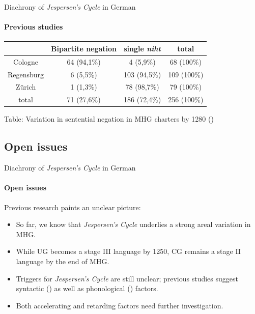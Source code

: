 \documentclass[xcolor=table, compress, %
handout
]{beamer}
\begin{document}
\begin{frame}{Diachrony of \textit{Jespersen's Cycle} in German}
\framesubtitle{Previous studies}

\begin{center}
\begin{tabular}{c c c c}
\hline\hline
 & \textbf{Bipartite negation} & \textbf{single \textit{niht}} & \textbf{total}\\
\hline
Cologne & 64 (94,1\%) & 4 (5,9\%) & 68 (100\%)\\
Regensburg & 6 (5,5\%) & 103 (94,5\%) & 109 (100\%)\\
Zürich & 1 (1,3\%) & 78 (98,7\%) & 79 (100\%)\\
\hline
total & 71 (27,6\%) & 186 (72,4\%) & 256 (100\%)\\
\hline\hline
\end{tabular}
\end{center}
\begin{small}
\begin{center}\smallskip
Table: Variation in sentential negation in MHG charters by 1280 (\citealt[98]{schueler16})\end{center}
\end{small}
\end{frame}

\subsection{Open issues}
\begin{frame}{Diachrony of \textit{Jespersen's Cycle} in German}
\framesubtitle{Open issues}

Previous research paints an unclear picture:

\begin{itemize}
    \item So far, we know that \textit{Jespersen's Cycle} underlies a strong areal variation in MHG.
    \item While UG becomes a stage III language by 1250, CG remains a stage II language by the end of MHG.
    \item Triggers for \textit{Jespersen's Cycle} are still unclear; previous studies suggest syntactic (\citealt{jaeger08,Breitbarth2014}) as well as phonological (\citealt{HertelimErscheinen}) factors.
    \item Both accelerating and retarding factors need further investigation.
\end{itemize}

\end{frame}
\end{document}
